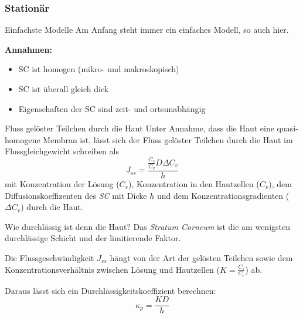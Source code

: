 \documentclass[utf8x,compress,professionalfonts]{beamer}
\begin{document}
\subsubsection{Station\"ar}
\begin{frame}{Einfachste Modelle}
  Am Anfang steht immer ein einfaches Modell, so auch hier.

  \vfill

  \textbf{Annahmen:}
  \begin{itemize}
    \item SC ist homogen (mikro- und makroskopisch)
      \bigskip
    \item SC ist \"uberall gleich dick
      \bigskip
    \item Eigenschaften der SC sind zeit- und ortsunabh\"angig
  \end{itemize}
\end{frame}


\begin{frame}{Fluss gel\"oster Teilchen durch die Haut}
  Unter Annahme, dass die Haut eine quasi-homogene Membran ist, l\"asst sich
  der Fluss gel\"oster Teilchen durch die Haut im Flussgleichgewicht schreiben als
  \begin{equation}
    J_{ss}=\frac{\frac{C_s}{C_v}D\Delta C_v}{h}
  \end{equation}
  mit Konzentration der L\"osung ($C_s$), Konzentration in den Hautzellen ($C_v$),
  dem Diffusionskoeffizenten des \textit{SC} mit Dicke $h$ und dem Konzentrationsgradienten
  ($\Delta C_v$) durch die Haut.
\end{frame}

\begin{frame}{Wie durchl\"assig ist denn die Haut?}
  Das \textit{Stratum Corneum} ist die am wenigsten durchl\"assige Schicht und der
  limitierende Faktor.
  \bigskip

  Die Flussgeschwindigkeit $J_{ss}$ h\"angt von der Art der gel\"osten Teilchen
  sowie dem Konzentrationsverhältnis zwischen L\"osung und Hautzellen ($K=\frac{C_s}{C_v}$)
  ab.
  \bigskip

  Daraus l\"asst sich ein Durchl\"assigkeitskoeffizient berechnen:
  \begin{equation}
    \kappa_p = \frac{KD}{h}
  \end{equation}
\end{frame}
\end{document}
